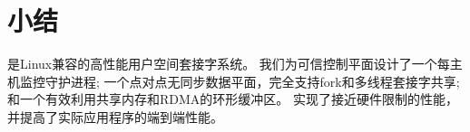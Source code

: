 \section{小结}
\label{socksdirect:sec:conclusion}

\sys {}是Linux兼容的高性能用户空间套接字系统。
我们为可信控制平面设计了一个每主机监控守护进程;
一个点对点无同步数据平面，完全支持fork和多线程套接字共享;
和一个有效利用共享内存和RDMA的环形缓冲区。
\sys {}实现了接近硬件限制的性能，并提高了实际应用程序的端到端性能。


